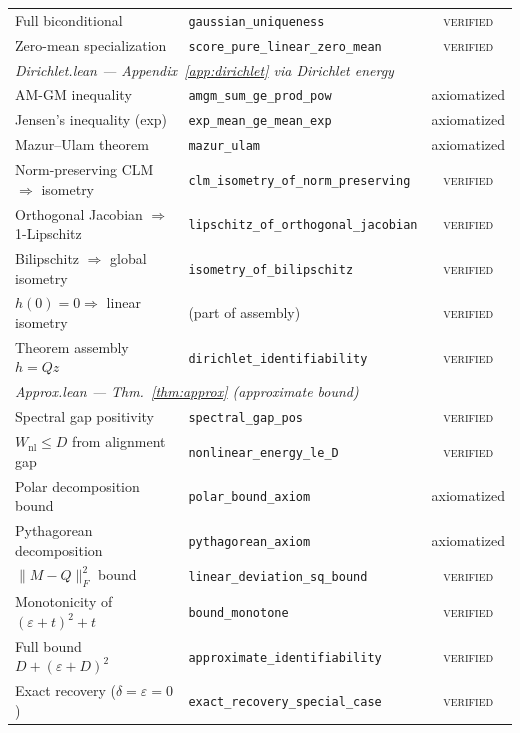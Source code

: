 \begin{table}[h]
\begin{tabular}{llc}
Full biconditional & \texttt{gaussian\_uniqueness} & \textsc{verified} \\
Zero-mean specialization & \texttt{score\_pure\_linear\_zero\_mean} & \textsc{verified} \\
\midrule
\multicolumn{3}{l}{\textit{Dirichlet.lean --- Appendix~\ref{app:dirichlet} via Dirichlet energy}} \\
AM-GM inequality & \texttt{amgm\_sum\_ge\_prod\_pow} & axiomatized \\
Jensen's inequality (exp) & \texttt{exp\_mean\_ge\_mean\_exp} & axiomatized \\
Mazur--Ulam theorem & \texttt{mazur\_ulam} & axiomatized \\
Norm-preserving CLM $\Rightarrow$ isometry & \texttt{clm\_isometry\_of\_norm\_preserving} & \textsc{verified} \\
Orthogonal Jacobian $\Rightarrow$ 1-Lipschitz & \texttt{lipschitz\_of\_orthogonal\_jacobian} & \textsc{verified} \\
Bilipschitz $\Rightarrow$ global isometry & \texttt{isometry\_of\_bilipschitz} & \textsc{verified} \\
$h(0) = 0 \Rightarrow$ linear isometry & (part of assembly) & \textsc{verified} \\
Theorem assembly $h = Qz$ & \texttt{dirichlet\_identifiability} & \textsc{verified} \\
\midrule
\multicolumn{3}{l}{\textit{Approx.lean --- Thm.~\ref{thm:approx} (approximate bound)}} \\
Spectral gap positivity & \texttt{spectral\_gap\_pos} & \textsc{verified} \\
$W_{\mathrm{nl}} \leq D$ from alignment gap & \texttt{nonlinear\_energy\_le\_D} & \textsc{verified} \\
Polar decomposition bound & \texttt{polar\_bound\_axiom} & axiomatized \\
Pythagorean decomposition & \texttt{pythagorean\_axiom} & axiomatized \\
$\|M - Q\|_F^2$ bound & \texttt{linear\_deviation\_sq\_bound} & \textsc{verified} \\
Monotonicity of $({\varepsilon} + t)^2 + t$ & \texttt{bound\_monotone} & \textsc{verified} \\
Full bound $D + (\varepsilon + D)^2$ & \texttt{approximate\_identifiability} & \textsc{verified} \\
Exact recovery ($\delta = \varepsilon = 0$) & \texttt{exact\_recovery\_special\_case} & \textsc{verified} \\
\midrule

\end{tabular}
\end{table}
